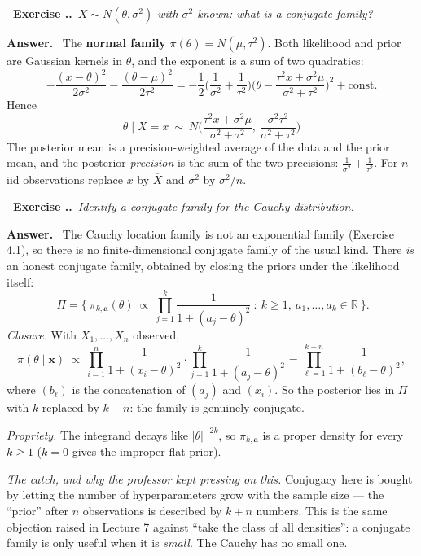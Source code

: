 \documentclass[11pt]{article}
\newcommand{\R}{\mathbb{R}}
\newcommand{\Xbar}{\overline{X}}
\newcounter{exc}[section]
\newenvironment{exc}[1]{\medskip\refstepcounter{exc}%
  \noindent\textbf{\color{ForestGreen}\raisebox{0.5pt}{\scriptsize$\blacksquare$}\ Exercise \thesection.\theexc.}\ \textit{#1}\par\nopagebreak}{\par}
\newcommand{\ans}{\smallskip\noindent\textbf{Answer.}\ }
\begin{document}
\begin{exc}{$X\sim N(\theta,\sigma^2)$ with $\sigma^2$ known: what is a conjugate family?}
\end{exc}
\ans
The \textbf{normal family} $\pi(\theta)=N(\mu,\tau^2)$. Both likelihood and prior are
Gaussian kernels in $\theta$, and the exponent is a sum of two quadratics:
\[
-\frac{(x-\theta)^2}{2\sigma^2}-\frac{(\theta-\mu)^2}{2\tau^2}
=-\frac12\Big(\frac{1}{\sigma^2}+\frac{1}{\tau^2}\Big)
\Big(\theta-\frac{\tau^2x+\sigma^2\mu}{\sigma^2+\tau^2}\Big)^2+\text{const}.
\]
Hence
\[
\boxed{\ \theta\mid X=x\ \sim\ N\!\Big(\frac{\tau^2x+\sigma^2\mu}{\sigma^2+\tau^2},\
\frac{\sigma^2\tau^2}{\sigma^2+\tau^2}\Big)\ }
\]
The posterior mean is a precision-weighted average of the data and the prior mean, and the
posterior \emph{precision} is the sum of the two precisions:
$\tfrac{1}{\sigma^2}+\tfrac{1}{\tau^2}$. For $n$ iid observations replace $x$ by $\Xbar$ and
$\sigma^2$ by $\sigma^2/n$.

\begin{exc}{Identify a conjugate family for the Cauchy distribution.}
\end{exc}
\ans
The Cauchy location family is not an exponential family (Exercise 4.1), so there is no
finite-dimensional conjugate family of the usual kind. There \emph{is} an honest conjugate
family, obtained by closing the priors under the likelihood itself:
\[
\boxed{\ \Pi=\Bigg\{\ \pi_{k,\mathbf a}(\theta)\ \propto\ \prod_{j=1}^{k}
\frac{1}{1+(a_j-\theta)^2}\ :\ k\ge1,\ a_1,\dots,a_k\in\R\ \Bigg\}. }
\]
\emph{Closure.} With $X_1,\dots,X_n$ observed,
\[
\pi(\theta\mid\mathbf x)\ \propto\ \prod_{i=1}^{n}\frac{1}{1+(x_i-\theta)^2}
\cdot\prod_{j=1}^{k}\frac{1}{1+(a_j-\theta)^2}
=\prod_{\ell=1}^{k+n}\frac{1}{1+(b_\ell-\theta)^2},
\]
where $(b_\ell)$ is the concatenation of $(a_j)$ and $(x_i)$. So the posterior lies in $\Pi$
with $k$ replaced by $k+n$: the family is genuinely conjugate.

\emph{Propriety.} The integrand decays like $|\theta|^{-2k}$, so $\pi_{k,\mathbf a}$ is a
proper density for every $k\ge1$ ($k=0$ gives the improper flat prior).

\emph{The catch, and why the professor kept pressing on this.} Conjugacy here is bought by
letting the number of hyperparameters grow with the sample size --- the ``prior'' after
$n$ observations is described by $k+n$ numbers. This is the same objection raised in Lecture 7
against ``take the class of all densities'': a conjugate family is only useful when it is
\emph{small}. The Cauchy has no small one.
\end{document}

